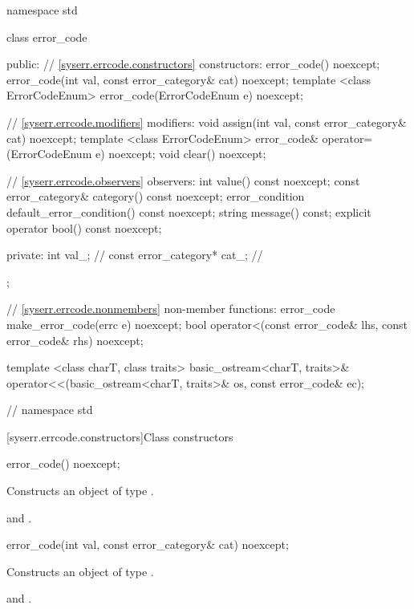 %
\begin{codeblock}
namespace std {
  class error_code {
  public:
    // \ref{syserr.errcode.constructors} constructors:
    error_code() noexcept;
    error_code(int val, const error_category& cat) noexcept;
    template <class ErrorCodeEnum>
      error_code(ErrorCodeEnum e) noexcept;

    // \ref{syserr.errcode.modifiers} modifiers:
    void assign(int val, const error_category& cat) noexcept;
    template <class ErrorCodeEnum>
        error_code& operator=(ErrorCodeEnum e) noexcept;
    void clear() noexcept;

    // \ref{syserr.errcode.observers} observers:
    int value() const noexcept;
    const error_category& category() const noexcept;
    error_condition default_error_condition() const noexcept;
    string message() const;
    explicit operator bool() const noexcept;

  private:
    int val_;                   // \expos
    const error_category* cat_; // \expos
  };

  // \ref{syserr.errcode.nonmembers} non-member functions:
  error_code make_error_code(errc e) noexcept;
  bool operator<(const error_code& lhs, const error_code& rhs) noexcept;

  template <class charT, class traits>
    basic_ostream<charT, traits>&
      operator<<(basic_ostream<charT, traits>& os, const error_code& ec);
}   // namespace std
\end{codeblock}

[syserr.errcode.constructors]{Class  constructors}

\begin{itemdecl}
error_code() noexcept;
\end{itemdecl}

\begin{itemdescr}
\pnum
\effects Constructs an object of type .

\pnum
\postconditions {} and .
\end{itemdescr}

\begin{itemdecl}
error_code(int val, const error_category& cat) noexcept;
\end{itemdecl}

\begin{itemdescr}
\pnum
\effects Constructs an object of type .

\pnum
\postconditions {} and .
\end{itemdescr}

